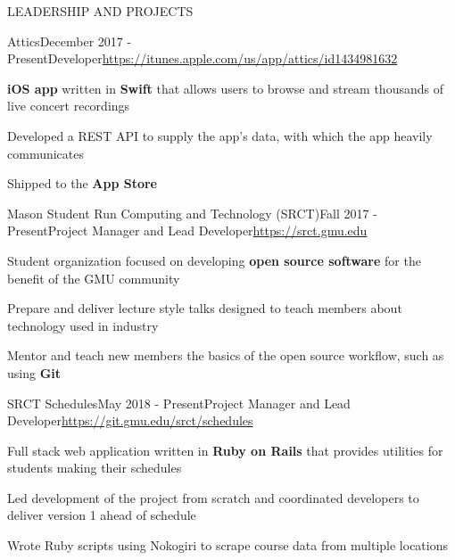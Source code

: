 \documentclass{resume} %
\begin{document}

\begin{rSection}{LEADERSHIP AND PROJECTS}

  \begin{rSubsection}{Attics}{December 2017 - Present}{Developer}{\url{https://itunes.apple.com/us/app/attics/id1434981632}} 

    \item \textbf{iOS app} written in \textbf{Swift} that allows users to browse and stream thousands of live concert recordings
    \item Developed a REST API to supply the app's data, with which the app heavily communicates
    \item Shipped to the \textbf{App Store}
    
  \end{rSubsection}

  \begin{rSubsection}{Mason Student Run Computing and Technology (SRCT)}{Fall 2017 - Present}{Project Manager and Lead Developer}{\url{https://srct.gmu.edu}} 

    \item Student organization focused on developing \textbf{open source software} for the benefit of the GMU community
    \item Prepare and deliver lecture style talks designed to teach members about technology used in industry
    \item Mentor and teach new members the basics of the open source workflow, such as using \textbf{Git}
 
  \end{rSubsection}

  \begin{rSubsection}{SRCT Schedules}{May 2018 - Present}{Project Manager and Lead Developer}{\url{https://git.gmu.edu/srct/schedules}} 

    \item Full stack web application written in \textbf{Ruby on Rails} that provides utilities for students making their schedules
    \item Led development of the project from scratch and coordinated developers to deliver version 1 ahead of schedule
    \item Wrote Ruby scripts using Nokogiri to scrape course data from multiple locations
    
  \end{rSubsection}

\end{rSection} 
\end{document}
